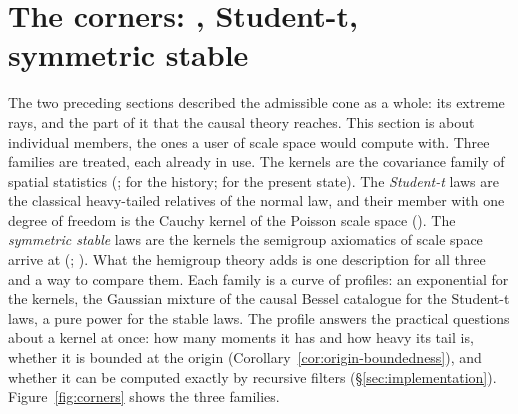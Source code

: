 
\section{The corners: \texorpdfstring{\Matern{}}{Matern}, Student-t, symmetric stable}
\label{sec:corners}

The two preceding sections described the admissible cone as a whole: its extreme rays, and the
part of it that the causal theory reaches. This section is about individual members, the ones
a user of scale space would compute with. Three families are treated, each already in use.
The \emph{\Matern{}} kernels are the
covariance family of spatial statistics (;
 for the history;  for the present state).
The \emph{Student-t} laws are the classical heavy-tailed relatives of the normal law, and
their member with one degree of freedom is the Cauchy kernel of the Poisson scale space
(). The \emph{symmetric stable} laws are the kernels the
semigroup axiomatics of scale space arrive at (;
). What the hemigroup theory adds is one description for all three and
a way to compare them. Each family is a curve of profiles: an exponential for the \Matern{}
kernels, the Gaussian mixture of the causal Bessel catalogue for the Student-t laws, a pure
power for the stable laws. The profile answers the practical questions about a kernel at
once: how many moments it has and how heavy its tail is, whether it is
bounded at the origin (Corollary~\ref{cor:origin-boundedness}), and whether it can be computed
exactly by recursive filters (\S\ref{sec:implementation}). Figure~\ref{fig:corners} shows the
three families.

